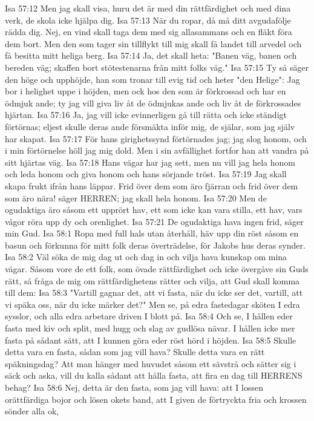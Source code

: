 Isa 57:12  Men jag skall visa, huru det är med din rättfärdighet och med dina verk, de skola icke hjälpa dig.
Isa 57:13  När du ropar, då må ditt avgudafölje rädda dig. Nej, en vind skall taga dem med sig allasammans och en fläkt föra dem bort. Men den som tager sin tillflykt till mig skall få landet till arvedel och få besitta mitt heliga berg.
Isa 57:14  Ja, det skall heta: "Banen väg, banen och bereden väg; skaffen bort stötestenarna från mitt folks väg."
Isa 57:15  Ty så säger den höge och upphöjde, han som tronar till evig tid och heter "den Helige": Jag bor i helighet uppe i höjden, men ock hos den som är förkrossad och har en ödmjuk ande; ty jag vill giva liv åt de ödmjukas ande och liv åt de förkrossades hjärtan.
Isa 57:16  Ja, jag vill icke evinnerligen gå till rätta och icke ständigt förtörnas; eljest skulle deras ande försmäkta inför mig, de själar, som jag själv har skapat.
Isa 57:17  För hans girighetssynd förtörnades jag; jag slog honom, och i min förtörnelse höll jag mig dold. Men i sin avfällighet fortfor han att vandra på sitt hjärtas väg.
Isa 57:18  Hans vägar har jag sett, men nu vill jag hela honom och leda honom och giva honom och hans sörjande tröst.
Isa 57:19  Jag skall skapa frukt ifrån hans läppar. Frid över dem som äro fjärran och frid över dem som äro nära! säger HERREN; jag skall hela honom.
Isa 57:20  Men de ogudaktiga äro såsom ett upprört hav, ett som icke kan vara stilla, ett hav, vars vågor röra upp dy och orenlighet.
Isa 57:21  De ogudaktiga hava ingen frid, säger min Gud.
Isa 58:1  Ropa med full hals utan återhåll, häv upp din röst såsom en basun och förkunna för mitt folk deras överträdelse, för Jakobs hus deras synder.
Isa 58:2  Väl söka de mig dag ut och dag in och vilja hava kunskap om mina vägar. Såsom vore de ett folk, som övade rättfärdighet och icke övergåve sin Guds rätt, så fråga de mig om rättfärdighetens rätter och vilja, att Gud skall komma till dem:
Isa 58:3  "Vartill gagnar det, att vi fasta, när du icke ser det, vartill, att vi späka oss, när du icke märker det?" Men se, på edra fastedagar sköten I edra sysslor, och alla edra arbetare driven I blott på.
Isa 58:4  Och se, I hållen eder fasta med kiv och split, med hugg och slag av gudlösa nävar. I hållen icke mer fasta på sådant sätt, att I kunnen göra eder röst hörd i höjden.
Isa 58:5  Skulle detta vara en fasta, sådan som jag vill hava? Skulle detta vara en rätt späkningsdag? Att man hänger med huvudet såsom ett sävstrå och sätter sig i säck och aska, vill du kalla sådant att hålla fasta, att fira en dag till HERRENS behag?
Isa 58:6  Nej, detta är den fasta, som jag vill hava: att I lossen orättfärdiga bojor och lösen okets band, att I given de förtryckta fria och krossen sönder alla ok,
